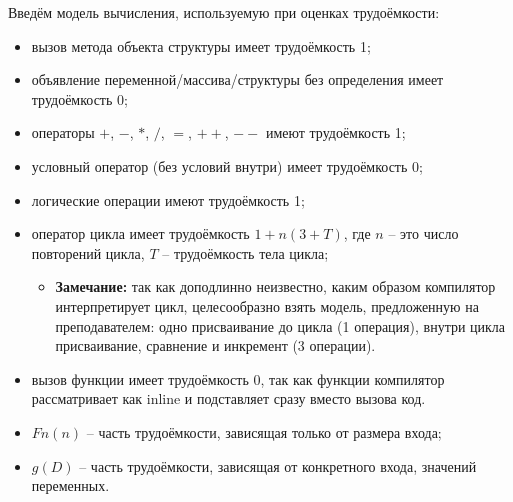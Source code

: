 \documentclass[utf8x, 12pt]{G7-32} %
\begin{document}
Введём модель вычисления, используемую при оценках трудоёмкости:
\begin{itemize}
	\item вызов метода объекта структуры имеет трудоёмкость 1;
	\item объявление переменной/массива/структуры без определения имеет трудоёмкость 0;
	\item операторы $+$, $-$, $*$, $/$, $=$, $++$, $--$ имеют трудоёмкость 1;
	\item условный оператор (без условий внутри) имеет трудоёмкость 0;
	\item логические операции имеют трудоёмкость 1; 
	\item оператор цикла имеет трудоёмкость $1 + n(3 + T)$, где $n$ – это число повторений цикла, $T$ – трудоёмкость тела цикла;
	\begin{itemize}
		\item \textbf{Замечание:} так как доподлинно неизвестно, каким образом компилятор интерпретирует цикл, целесообразно взять модель, предложенную на преподавателем: одно присваивание до цикла (1 операция), внутри цикла присваивание, сравнение и инкремент (3 операции).
	\end{itemize}
	\item вызов функции имеет трудоёмкость 0, так как функции компилятор рассматривает как inline и подставляет сразу вместо вызова код.
	\item $Fn(n)$ – часть трудоёмкости, зависящая только от размера входа;
	\item $g(D)$ – часть трудоёмкости, зависящая от конкретного входа, значений переменных.
\end{itemize}

\newpage
\end{document}
